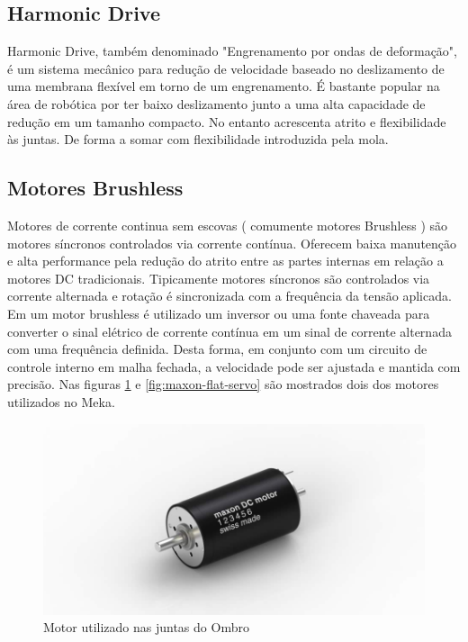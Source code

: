 \subsection{Harmonic Drive}

Harmonic Drive, também denominado "Engrenamento por ondas de deformação", é um sistema mecânico para redução de velocidade baseado no deslizamento de uma membrana flexível em torno de um engrenamento. É bastante popular na área de robótica por ter baixo deslizamento junto a uma alta capacidade de redução em um tamanho compacto. No entanto acrescenta atrito e flexibilidade às juntas. De forma a somar com flexibilidade introduzida pela mola. 




\subsection{Motores Brushless}
Motores de corrente continua sem escovas ( comumente motores Brushless ) são motores síncronos controlados via corrente contínua. Oferecem baixa manutenção e alta performance pela redução do atrito entre as partes internas em relação a motores DC tradicionais. Tipicamente motores síncronos são controlados via corrente alternada e rotação é sincronizada com a frequência da tensão aplicada. Em um motor brushless é utilizado um inversor ou uma fonte chaveada para converter o sinal elétrico de corrente contínua em um sinal de corrente alternada com uma frequência definida. Desta forma, em conjunto com um circuito de controle interno em malha fechada, a velocidade pode ser ajustada e mantida com precisão. \cite{nobody} Nas figuras \ref{fig:maxon-servo} e \ref{fig:maxon-flat-servo} são mostrados dois dos motores utilizados no Meka.

\begin{figure}[H]
    \centering
    \includegraphics[width = 0.6\linewidth]{figs/maxon_servo.jpg}
    \caption{Motor utilizado nas juntas do Ombro}
    \label{fig:maxon-servo}
\end{figure}

